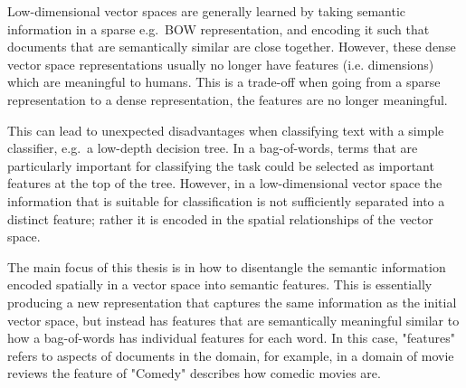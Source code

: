 Low-dimensional vector spaces are generally learned by taking  semantic information  in a sparse e.g.\ BOW representation, and encoding it  such that documents that are semantically similar are close together. However, these dense vector space representations usually no longer have features (i.e. dimensions) which are meaningful to humans. This is a trade-off when going from a sparse representation to a dense representation, the features are no longer meaningful. 

This can lead to unexpected disadvantages when classifying text with a simple classifier, e.g.\ a low-depth decision tree. In a bag-of-words, terms that are particularly important for classifying the task could be selected as important features at the top of the tree. However, in a low-dimensional vector space the information that is suitable for classification is not sufficiently separated into a distinct feature; rather it is encoded in the spatial relationships of the vector space.%

The main focus of this thesis is in how to disentangle the semantic information encoded spatially in a vector space into semantic features. This is essentially producing a new representation that captures the same information as the initial vector space, but instead has features that are semantically meaningful similar to how a bag-of-words has individual features for each word.  In this case, "features" refers to aspects of documents in the domain, for example, in a domain of movie reviews the  feature of "Comedy"  describes how comedic movies are.















